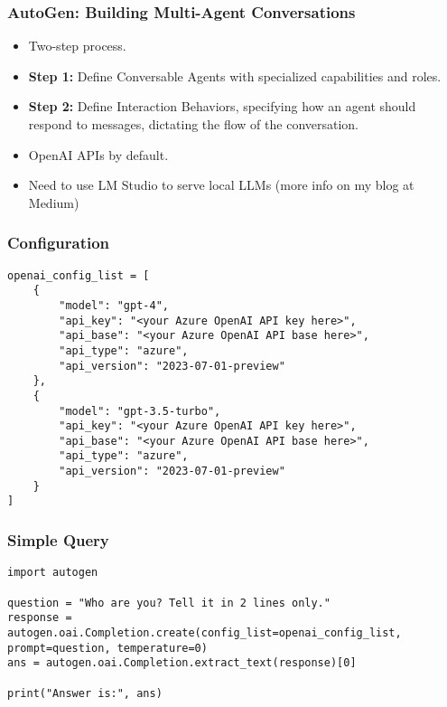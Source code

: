 \begin{frame}[fragile]\frametitle{AutoGen: Building Multi-Agent Conversations}
  \begin{itemize}
    \item Two-step process.
    \item \textbf{Step 1:} Define Conversable Agents with specialized capabilities and roles.
    \item \textbf{Step 2:} Define Interaction Behaviors, specifying how an agent should respond to messages, dictating the flow of the conversation.
    \item OpenAI APIs by default.
	\item Need to use LM Studio to serve local LLMs (more info on my blog at Medium)
  \end{itemize}
\end{frame}

\begin{frame}[fragile]\frametitle{Configuration}
  \begin{lstlisting}
openai_config_list = [
    {
        "model": "gpt-4",
        "api_key": "<your Azure OpenAI API key here>",
        "api_base": "<your Azure OpenAI API base here>",
        "api_type": "azure",
        "api_version": "2023-07-01-preview"
    },
    {
        "model": "gpt-3.5-turbo",
        "api_key": "<your Azure OpenAI API key here>",
        "api_base": "<your Azure OpenAI API base here>",
        "api_type": "azure",
        "api_version": "2023-07-01-preview"
    }
]
  \end{lstlisting}
\end{frame}

\begin{frame}[fragile]\frametitle{Simple Query}
  \begin{lstlisting}
import autogen

question = "Who are you? Tell it in 2 lines only."
response = autogen.oai.Completion.create(config_list=openai_config_list, prompt=question, temperature=0)
ans = autogen.oai.Completion.extract_text(response)[0]

print("Answer is:", ans)
  \end{lstlisting}
\end{frame}


